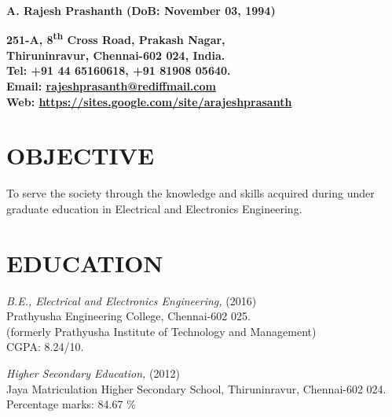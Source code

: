 \documentclass[line,margin,12pt ]{res}
\begin{document}
\thispagestyle{empty} %
\setlength{\parindent}{0cm}
{\large \bf A. Rajesh Prashanth (DoB: November 03, 1994)}
\begin{resume}






\begin{flushright}
\bf {251-A, 8\textsuperscript{th} Cross Road, Prakash Nagar,\\
Thiruninravur, Chennai-602 024, India.\\
Tel: +91 44 65160618, +91 81908 05640.\\ 
Email: \href{mailto:rajeshprasanth@rediffmail.com}{rajeshprasanth@rediffmail.com}\\
Web: \url{https://sites.google.com/site/arajeshprasanth}}\\
\end{flushright}


\section{OBJECTIVE}
To serve the society through the knowledge and skills acquired during under \\graduate education in Electrical and Electronics Engineering.


\section{EDUCATION} 
{\sl B.E., Electrical and Electronics Engineering,} \hfill (2016) \\
                Prathyusha Engineering College, Chennai-602 025.
					\\(formerly Prathyusha Institute of Technology and Management)
					\\CGPA: 8.24/10.

{\sl Higher Secondary Education,} \hfill (2012)\\
                Jaya Matriculation Higher Secondary School, Thiruninravur, Chennai-602 024.\\ 
                Percentage marks: 84.67 \%


\end{resume}
\end{document}

